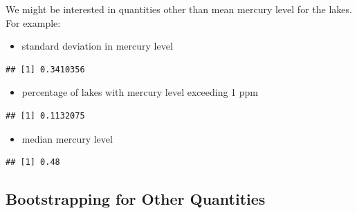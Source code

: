 \documentclass[]{book}
\newenvironment{Shaded}{\begin{snugshade}}{\end{snugshade}}
\newcommand{\KeywordTok}[1]{\textcolor[rgb]{0.13,0.29,0.53}{\textbf{#1}}}
\newcommand{\DecValTok}[1]{\textcolor[rgb]{0.00,0.00,0.81}{#1}}
\newcommand{\OperatorTok}[1]{\textcolor[rgb]{0.81,0.36,0.00}{\textbf{#1}}}
\newcommand{\NormalTok}[1]{#1}
\providecommand{\tightlist}{%
  \setlength{\itemsep}{0pt}\setlength{\parskip}{0pt}}
\begin{document}
We might be interested in quantities other than mean mercury level for
the lakes. For example:

\begin{itemize}
\tightlist
\item
  standard deviation in mercury level
\end{itemize}

\begin{Shaded}
\end{Shaded}

\begin{verbatim}
## [1] 0.3410356
\end{verbatim}

\begin{itemize}
\tightlist
\item
  percentage of lakes with mercury level exceeding 1 ppm
\end{itemize}

\begin{Shaded}
\end{Shaded}

\begin{verbatim}
## [1] 0.1132075
\end{verbatim}

\begin{itemize}
\tightlist
\item
  median mercury level
\end{itemize}

\begin{Shaded}
\end{Shaded}

\begin{verbatim}
## [1] 0.48
\end{verbatim}

\subsection{Bootstrapping for Other
Quantities}\label{bootstrapping-for-other-quantities}
\end{document}
